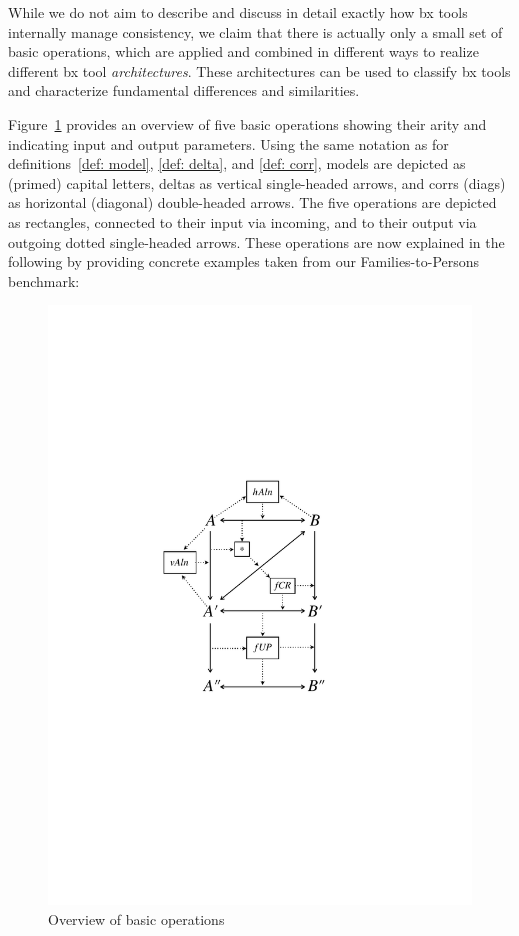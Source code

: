 While we do not aim to describe and discuss in detail exactly how bx tools internally manage consistency, we claim that there is actually only a small set of basic operations, which are applied and combined in different ways to realize different bx tool \emph{architectures}.
These architectures can be used to classify bx tools and characterize fundamental differences and similarities.

Figure~\ref{fig:basicOperationsOverview} provides an overview of five basic operations showing their arity and indicating input and output parameters.
Using the same notation as for definitions~\ref{def: model}, \ref{def: delta}, and \ref{def: corr}, models are depicted as (primed) capital letters, deltas as vertical single-headed arrows, and corrs (diags) as horizontal (diagonal) double-headed arrows.
The five operations are depicted as rectangles, connected to their input via incoming, and to their output via outgoing dotted single-headed arrows. 
These operations are now explained in the following by providing concrete examples taken from our Families-to-Persons benchmark:

\begin{figure}[bt!]
	\centering
	\includegraphics[width=0.55\columnwidth]{diagrams/foundations//BasicOperationsOverview}
	\caption{Overview of basic operations}
	\label{fig:basicOperationsOverview}
\end{figure}

